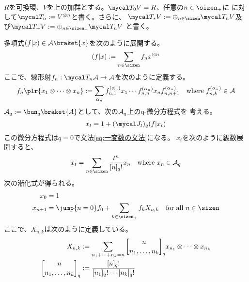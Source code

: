 {	$R$を可換環、$V$を上の加群とする。$\T_0V=R$、任意の$n\in\sizen_+$に
	に対して$\T_n:=V^{\otimes n}$と書く。さらに、
	$\T_*V:=\oplus_{n\in\sizen}\T_nV$及び$\T_+V:=\oplus_{n\in\sizen_+}\T_nV$
	と書く。

	多項式$(f|x)\in\calA\braket{x}$を次のように展開する。
	\begin{equation*}\begin{split}
		(f|x) := \sum_{n\in\sizen} f_nx^{\otimes n}
	\end{split}\end{equation*}
	ここで、線形射$f_n:\T_n\calA\to\calA$を次のように定義する。
	\begin{equation*}\begin{split}
		f_n\plr{x_1\otimes\cdots\otimes x_n} := \sum_{\alpha_n} 
			f_{n,1}^{(\alpha_n)} x_1 \cdots f_{n,n}^{(\alpha_n)} 
			x_n f_{n,n+1}^{(\alpha_n)} \quad\text{where } 
			f_{n,k}^{(\alpha_n)}\in\calA
	\end{split}\end{equation*}
	$\calA_q:=\bun_q\braket{A}$として、次の$\mathcal{A}_q$上のq-微分方程式を
	考える。
	\begin{equation}\label{eq:一変数のq-文法}\begin{split}
		x_t = 1 + (\J_t)_q(f|x_t)
	\end{split}\end{equation}
	この微分方程式は$q=0$で文法\eqref{eq:一変数の文法}になる。
	$x_t$を次のように級数展開すると、
	\begin{equation*}\begin{split}
		x_t = \sum_{n\in\sizen} \frac{t^n}{[n]_q!} x_n 
		\quad\text{where } x_n\in\calA_q
	\end{split}\end{equation*}
	次の漸化式が得られる。
	\begin{equation}\label{eq:一変数の言語の漸化式}\begin{split}
		x_0 &= 1 \\
		x_{n+1} &= \jump{n=0}f_0 + \sum_{k\in\sizen_+} f_k X_{n,k}
			\quad\text{for all } n\in\sizen \\
	\end{split}\end{equation}
	ここで、$X_{n,k}$は次のように定義している。
	\begin{equation*}\begin{split}
		X_{n,k} &:= \sum_{n_1+\cdots+n_k=n} \qbinom{n}{n_1,\dots,n_k}_q
			x_{n_1}\otimes\cdots\otimes x_{n_k} \\
		\qbinom{n}{n_1,\dots,n_k}_q &:= \frac{[n]_q!}{[n_1]_q!\cdots[n_k]_q!}
	\end{split}\end{equation*}

}
